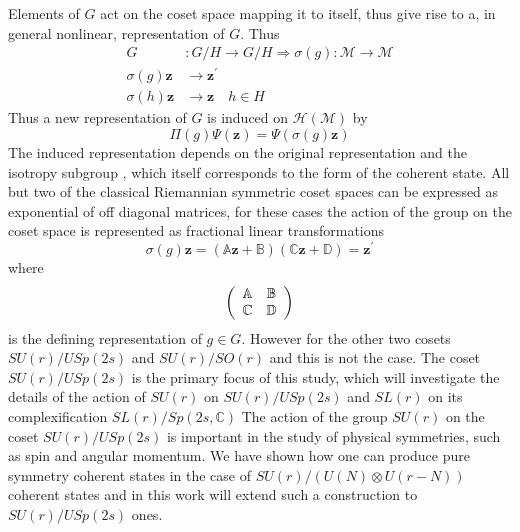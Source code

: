 \documentclass[aps,preprint]{revtex4}%
\begin{document}
Elements of $G$ act on the coset space mapping it to itself, thus give rise to
a, in general nonlinear, representation of $G$. Thus
\begin{align}
G  &  :G/H\rightarrow G/H\Rightarrow\sigma\left(  g\right)
:\mathcal{M\rightarrow M}\\
\sigma\left(  g\right)  \mathbf{z}  &  \mathbf{\rightarrow z}^{\prime}\\
\sigma\left(  h\right)  \mathbf{z}  &  \mathbf{\rightarrow z\quad}h\in H
\end{align}
Thus a new representation of $G$ is induced on $\mathcal{H}\left(
\mathcal{M}\right)  $ by
\begin{equation}
\Pi\left(  g\right)  \Psi\left(  \mathbf{z}\right)  =\Psi\left(  \sigma\left(
g\right)  \mathbf{z}\right)
\end{equation}
The induced representation depends on the original representation and the
isotropy subgroup , which itself corresponds to the form of the coherent
state. All but two of the classical Riemannian symmetric coset spaces can be
expressed as exponential of off diagonal matrices, for these cases the action
of the group on the coset space is represented as fractional linear
transformations
\begin{equation}
\sigma\left(  g\right)  \mathbf{z}=\left(  \mathbb{A}\mathbf{z}+\mathbb{B}%
\right)  \left(  \mathbb{C}\mathbf{z}+\mathbb{D}\right)  =\mathbf{z}^{\prime}%
\end{equation}
where
\begin{equation}
\left(
\begin{array}
[c]{cc}%
\mathbb{A} & \mathbb{B}\\
\mathbb{C} & \mathbb{D}%
\end{array}
\right)
\end{equation}
is the defining representation of $g\in G$. However for the other two cosets
$SU\left(  r\right)  /USp\left(  2s\right)  $ and $SU\left(  r\right)
/SO\left(  r\right)  $ and this is not the case. The coset $SU\left(
r\right)  /USp\left(  2s\right)  $ is the primary focus of this study, which
will investigate the details of the action of $SU\left(  r\right)  $ on
$SU\left(  r\right)  /USp\left(  2s\right)  $ and $SL\left(  r\right)  $ on
its complexification $SL\left(  r\right)  /Sp\left(  2s,\mathbb{C}\right)  $
The action of the group $SU\left(  r\right)  $ on the coset $SU\left(
r\right)  /USp\left(  2s\right)  $ is important in the study of physical
symmetries, such as spin and angular momentum. We have shown how one can
produce pure symmetry coherent states in the case of $SU\left(  r\right)
/\left(  U\left(  N\right)  \otimes U\left(  r-N\right)  \right)  $ coherent
states and in this work will extend such a construction to $SU\left(
r\right)  /USp\left(  2s\right)  $ ones.
\end{document}
